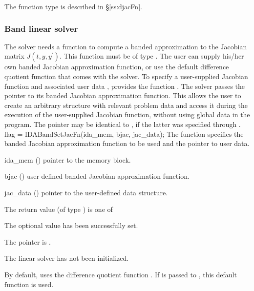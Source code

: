 {{  The function type  is described in \S\ref{ss:djacFn}.
}
\subsubsection{Band linear solver}\label{sss:optin_band}
The 
{\idaband} solver needs a function to compute a banded approximation to the
Jacobian matrix $J(t,y,y^\prime)$. This function must be of type . 
The user can supply his/her own banded Jacobian approximation function, 
or use the default difference quotient function  
that comes with the {\idaband} solver.
To specify a user-supplied Jacobian function  and associated user 
data , {\idaband} provides the function .
The {\idaband} solver passes the pointer 
to its banded Jacobian approximation function. This allows the user to
create an arbitrary structure with relevant problem data and access it
during the execution of the user-supplied Jacobian function, without using
global data in the program.  The pointer  may be identical
to , if the latter was specified through .
{
  flag = IDABandSetJacFn(ida\_mem, bjac, jac\_data);
}
{
  The function  specifies the banded Jacobian
  approximation function to be used and the pointer to user data.
}
{
  \begin{args}
  \item[ida\_mem] ()
    pointer to the {\ida} memory block.
  \item[bjac] ()
    user-defined banded Jacobian approximation function.
  \item[jac\_data] ()
    pointer to the user-defined data structure.
  \end{args}
}
{
  The return value  (of type ) is one of
  \begin{args}
  \item[\Id{IDABAND\_SUCCESS}] 
    The optional value has been successfully set.
  \item[\Id{IDABAND\_MEM\_NULL}]
    The  pointer is .
  \item[\Id{IDABAND\_LMEM\_NULL}]
    The {\idaband} linear solver has not been initialized.
  \end{args}
}
{
  By default, {\idaband} uses the difference quotient function .
  If  is passed to , this default function is used.

}}
